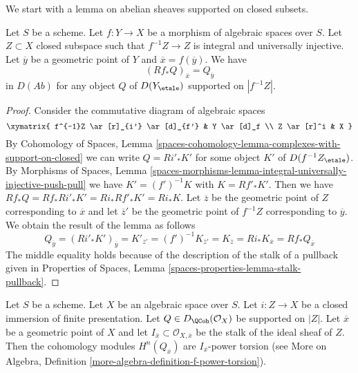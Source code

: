 \medskip\noindent
We start with a lemma on abelian sheaves supported on closed subsets.

\begin{lemma}
\label{lemma-stalk-pushforward-with-support}
Let $S$ be a scheme. Let $f : Y \to X$ be a morphism of algebraic spaces
over $S$. Let $Z \subset X$ closed subspace such that $f^{-1}Z \to Z$ is
integral and universally injective. Let $\overline{y}$ be a geometric point
of $Y$ and $\overline{x} = f(\overline{y})$. We have
$$
(Rf_*Q)_{\overline{x}} = Q_{\overline{y}}
$$
in $D(\textit{Ab})$ for any object $Q$ of $D(Y_\etale)$ supported
on $|f^{-1}Z|$.
\end{lemma}

\begin{proof}
Consider the commutative diagram of algebraic spaces
$$
\xymatrix{
f^{-1}Z \ar[r]_{i'} \ar[d]_{f'} & Y \ar[d]_f \\
Z \ar[r]^i & X
}
$$
By Cohomology of Spaces, Lemma
\ref{spaces-cohomology-lemma-complexes-with-support-on-closed} we can write
$Q = Ri'_*K'$ for some object $K'$ of $D(f^{-1}Z_\etale)$.
By Morphisms of Spaces, Lemma
\ref{spaces-morphisms-lemma-integral-universally-injective-push-pull}
we have $K' = (f')^{-1}K$ with $K = Rf'_*K'$.
Then we have $Rf_*Q = Rf_*Ri'_*K' = Ri_*Rf'_*K' = Ri_*K$.
Let $\overline{z}$ be the geometric point of $Z$ corresponding
to $\overline{x}$ and let $\overline{z}'$ be the geometric point
of $f^{-1}Z$ corresponding to $\overline{y}$. We obtain
the result of the lemma as follows
$$
Q_{\overline{y}} = (Ri'_*K')_{\overline{y}} = K'_{\overline{z}'} =
(f')^{-1}K_{\overline{z}'} = K_{\overline{z}} = Ri_*K_{\overline{x}} =
Rf_*Q_{\overline{x}}
$$
The middle equality holds because of the description of the stalk
of a pullback given in Properties of Spaces, Lemma \ref{spaces-properties-lemma-stalk-pullback}.
\end{proof}

\begin{lemma}
\label{lemma-stalk-of-module-with-support}
Let $S$ be a scheme. Let $X$ be an algebraic space over $S$.
Let $i : Z \to X$ be a closed immersion of finite presentation.
Let $Q \in D_\QCoh(\mathcal{O}_X)$ be supported on $|Z|$.
Let $\overline{x}$ be a geometric point of $X$ and let
$I_{\overline{x}} \subset \mathcal{O}_{X, \overline{x}}$ be the stalk of
the ideal sheaf of $Z$. Then the cohomology modules
$H^n(Q_{\overline{x}})$ are $I_{\overline{x}}$-power torsion
(see More on Algebra, Definition
\ref{more-algebra-definition-f-power-torsion}).
\end{lemma}

